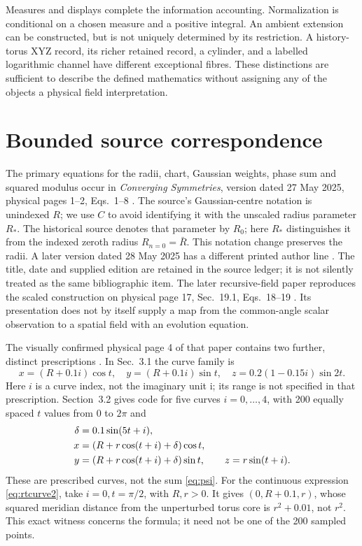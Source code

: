 \documentclass[11pt,a4paper]{article}
\theoremstyle{definition}
\theoremstyle{remark}
\newcommand{\ii}{\mathrm i}
\begin{document}
Measures and displays complete the information accounting.
Normalization is conditional on a chosen measure and a
positive integral. An ambient extension can be constructed,
but is not uniquely determined by its restriction. A
history-torus XYZ record, its richer retained record, a
cylinder, and a labelled logarithmic channel have different
exceptional fibres. These distinctions are sufficient to
describe the defined mathematics without assigning any of
the objects a physical field interpretation.

\appendix
\section{Bounded source correspondence}
\label{app:sources}
The primary equations for the radii, chart, Gaussian weights,
phase sum and squared modulus occur in
\emph{Converging Symmetries}, version dated 27 May 2025,
physical pages 1--2, Eqs.~1--8 \cite{cs1}. The source's
Gaussian-centre notation is unindexed $R$; we use $C$ to
avoid identifying it with the unscaled radius parameter $R_*$.
The historical source denotes that parameter by $R_0$; here
$R_*$ distinguishes it from the indexed zeroth radius
$R_{n=0}=\bar R$. This notation change preserves the radii.
A later version dated
28 May 2025 has a different printed author line \cite{cs2}.
The title, date and supplied edition are retained in the
source ledger; it is not silently treated as the same
bibliographic item.
The later recursive-field paper reproduces the scaled
construction on physical page 17, Sec.~19.1,
Eqs.~18--19 \cite{rt}. Its presentation does not by itself
supply a map from the common-angle scalar observation to a
spatial field with an evolution equation.

The visually confirmed physical page 4 of that paper contains
two further, distinct prescriptions \cite{pageSupplement}.
In Sec.~3.1 the curve family is
\begin{equation}
 x=(R+0.1i)\cos t,\quad y=(R+0.1i)\sin t,\quad
 z=0.2(1-0.15i)\sin2t.
 \label{eq:rtcurve1}
\end{equation}
Here $i$ is a curve index, not the imaginary unit $\ii$;
its range is not specified in that prescription.
Section~3.2 gives code for five curves $i=0,\ldots,4$,
with 200 equally spaced $t$ values from $0$ to $2\pi$ and
\begin{align}
 \delta&=0.1\sin(5t+i),\notag\\
 x&=(R+r\cos(t+i)+\delta)\cos t,\notag\\
 y&=(R+r\cos(t+i)+\delta)\sin t,\qquad
 z=r\sin(t+i).
 \label{eq:rtcurve2}
\end{align}
These are prescribed curves, not the sum \eqref{eq:psi}.
For the continuous expression \eqref{eq:rtcurve2}, take
$i=0,t=\pi/2$, with $R,r>0$. It gives
$(0,R+0.1,r)$, whose squared meridian distance from the
unperturbed torus core is $r^2+0.01$, not $r^2$.
This exact witness concerns the formula; it need not be
one of the 200 sampled points.
\end{document}
